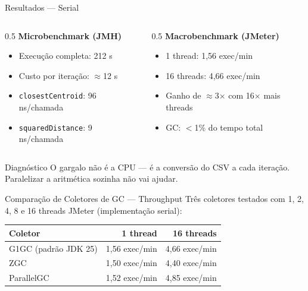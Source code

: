 \begin{frame}{Resultados --- Serial}
    \begin{columns}
        \begin{column}{0.5\textwidth}
            \textbf{Microbenchmark (JMH)}
            \begin{itemize}
                \item Execução completa: \alert{212 s}
                \item Custo por iteração: \alert{$\approx$12 s}
                \item \texttt{closestCentroid}: 96 ns/chamada
                \item \texttt{squaredDistance}: 9 ns/chamada
            \end{itemize}
        \end{column}
        \begin{column}{0.5\textwidth}
            \textbf{Macrobenchmark (JMeter)}
            \begin{itemize}
                \item 1 thread: 1,56 exec/min
                \item 16 threads: 4,66 exec/min
                \item Ganho de $\approx$3$\times$ com 16$\times$ mais threads
                \item GC: $<$1\% do tempo total
            \end{itemize}
        \end{column}
    \end{columns}

    \vspace{0.6em}
    \begin{alertblock}{Diagnóstico}
        O gargalo não é a CPU --- é a conversão do CSV a cada iteração.
        Paralelizar a aritmética sozinha não vai ajudar.
    \end{alertblock}
\end{frame}

\begin{frame}{Comparação de Coletores de GC --- Throughput}
    Três coletores testados com 1, 2, 4, 8 e 16 threads JMeter (implementação serial):

    \vspace{0.8em}
    \begin{center}
    \begin{tabular}{lrr}
        \toprule
        \textbf{Coletor} & \textbf{1 thread} & \textbf{16 threads} \\
        \midrule
        G1GC (padrão JDK 25) & 1,56 exec/min & 4,66 exec/min \\
        ZGC                  & 1,50 exec/min & 4,40 exec/min \\
        ParallelGC           & 1,52 exec/min & \alert{4,85 exec/min} \\
        \bottomrule
    \end{tabular}
    \end{center}
\end{frame}

